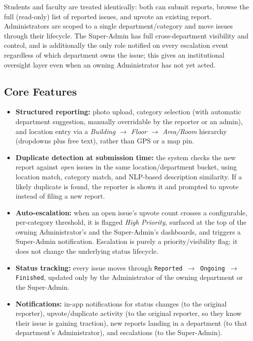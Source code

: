 \documentclass[11pt,a4paper]{article}
\begin{document}
\noindent Students and faculty are treated identically: both can submit reports,
browse the full (read-only) list of reported issues, and upvote an
existing report. Administrators are scoped to a single department/category
and move issues through their lifecycle. The Super-Admin has full
cross-department visibility and control, and is additionally the only
role notified on every escalation event regardless of which department
owns the issue; this gives an institutional oversight layer even when
an owning Administrator has not yet acted.

\subsection{Core Features}
\begin{itemize}[leftmargin=0.7cm]
  \item \textbf{Structured reporting:} photo upload, category selection
    (with automatic department suggestion, manually overridable by the
    reporter or an admin), and location entry via a
    \emph{Building $\rightarrow$ Floor $\rightarrow$ Area/Room} hierarchy
    (dropdowns plus free text), rather than GPS or a map pin.
  \item \textbf{Duplicate detection at submission time:} the system
    checks the new report against \emph{open} issues in the same
    location/department bucket, using location match, category match, and
    NLP-based description similarity. If a likely duplicate is found, the
    reporter is shown it and prompted to upvote instead of filing a new
    report.
  \item \textbf{Auto-escalation:} when an open issue's upvote count
    crosses a configurable, per-category threshold, it is flagged
    \emph{High Priority}, surfaced at the top of the owning
    Administrator's and the Super-Admin's dashboards, and triggers a
    Super-Admin notification. Escalation is purely a priority/visibility
    flag; it does not change the underlying status lifecycle.
  \item \textbf{Status tracking:} every issue moves through
    \texttt{Reported $\rightarrow$ Ongoing $\rightarrow$ Finished},
    updated only by the Administrator of the owning department or the
    Super-Admin.
  \item \textbf{Notifications:} in-app notifications for status changes
    (to the original reporter), upvote/duplicate activity (to the
    original reporter, so they know their issue is gaining traction), new
    reports landing in a department (to that department's Administrator),
    and escalations (to the Super-Admin).
\end{itemize}
\end{document}
